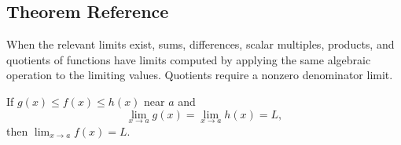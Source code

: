 \subsection*{Theorem Reference}

\begin{theorem*}
When the relevant limits exist, sums, differences, scalar multiples,
products, and quotients of functions have limits computed by applying the
same algebraic operation to the limiting values. Quotients require a
nonzero denominator limit.
\end{theorem*}

\begin{theorem*}
If \(g(x)\le f(x)\le h(x)\) near \(a\) and
\[
  \lim_{x\to a}g(x)=\lim_{x\to a}h(x)=L,
\]
then \(\lim_{x\to a}f(x)=L\).
\end{theorem*}
